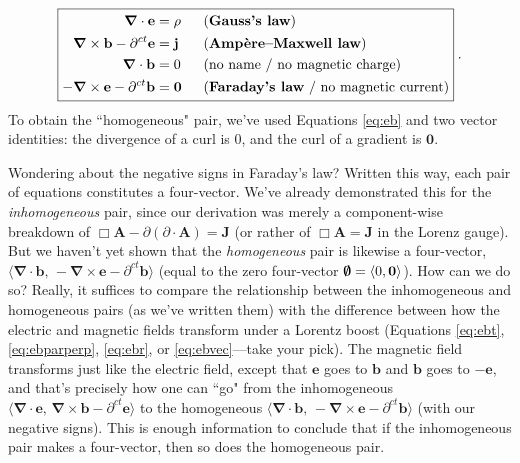 \documentclass[12pt]{article}
\renewcommand{\vv}[1]{\mathbf{#1}}
\newcommand{\del}{\boldsymbol{\nabla}}
\begin{document}
\begin{equation}\label{eq:me}
\boxed{
\begin{aligned}
\del \cdot \vv e &= \rho \; \; && \textrm{(\textbf{Gauss's law})} \\
\del \times \vv b - \partial^{ct} \vv e &= \vv j \; \; && \textrm{(\textbf{Amp\`ere--Maxwell law})} \\
\del \cdot \vv b &= 0 \; \; && \textrm{(no name / no magnetic charge)} \\
- \del \times \vv e - \partial^{ct} \vv b &= \vv 0 \; \; && \textrm{(\textbf{Faraday's law} / no magnetic current)}
\end{aligned}
} \; .
\end{equation}
To obtain the ``homogeneous" pair, we've used Equations \ref{eq:eb} and two vector identities: the divergence of a curl is $0$, and the curl of a gradient is $\vv 0$.

Wondering about the negative signs in Faraday's law? Written this way, each pair of equations constitutes a four-vector. We've already demonstrated this for the \emph{inhomogeneous} pair, since our derivation was merely a component-wise breakdown of $\Box \vv A - \partialup ( \partialup \cdot \vv A) = \vv J$ (or rather of $\Box \vv A = \vv J$ in the Lorenz gauge). But we haven't yet shown that the \emph{homogeneous} pair is likewise a four-vector, $\langle \del \cdot \vv b , \, - \del \times \vv e - \partial^{ct} \vv b \rangle$ (equal to the zero four-vector $\textrm{\mbox{\boldmath $\emptyset$}} = \langle 0, \vv 0 \rangle$). How can we do so? Really, it suffices to compare the relationship between the inhomogeneous and homogeneous pairs (as we've written them) with the difference between how the electric and magnetic fields transform under a Lorentz boost (Equations \ref{eq:ebt}, \ref{eq:ebparperp}, \ref{eq:ebr}, or \ref{eq:ebvec}---take your pick). The magnetic field transforms just like the electric field, except that $\vv e$ goes to $\vv b$ and $\vv b$ goes to $- \vv e$, and that's precisely how one can ``go" from the inhomogeneous $\langle \del \cdot \vv e , \, \del \times \vv b - \partial^{ct} \vv e \rangle$ to the homogeneous $\langle \del \cdot \vv b , \, - \del \times \vv e - \partial^{ct} \vv b \rangle$ (with our negative signs). This is enough information to conclude that if the inhomogeneous pair makes a four-vector, then so does the homogeneous pair.
\end{document}
